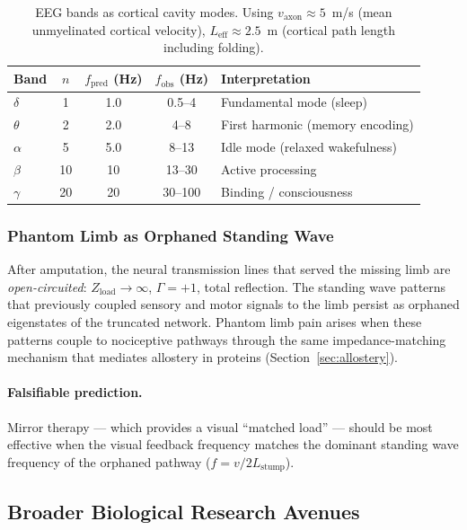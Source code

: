 \begin{table}[H]
\centering
\caption{EEG bands as cortical cavity modes.  Using
$v_\text{axon} \approx 5$~m/s (mean unmyelinated cortical
velocity), $L_\text{eff} \approx 2.5$~m (cortical path
length including folding).}
\label{tab:eeg_modes}
\small
\begin{tabular}{@{}l c c c l@{}}
\toprule
\textbf{Band} & $n$ & $f_\text{pred}$ (Hz) & $f_\text{obs}$ (Hz) & \textbf{Interpretation} \\
\midrule
$\delta$ & 1 & 1.0 & 0.5--4   & Fundamental mode (sleep) \\
$\theta$ & 2 & 2.0 & 4--8     & First harmonic (memory encoding) \\
$\alpha$ & 5 & 5.0 & 8--13    & Idle mode (relaxed wakefulness) \\
$\beta$  & 10 & 10  & 13--30   & Active processing \\
$\gamma$ & 20 & 20  & 30--100  & Binding / consciousness \\
\bottomrule
\end{tabular}
\end{table}


\subsubsection{Phantom Limb as Orphaned Standing Wave}
\label{sec:phantom_limb}

After amputation, the neural transmission lines that served
the missing limb are \emph{open-circuited}: $Z_\text{load}
\to \infty$, $\Gamma = +1$, total reflection.  The standing
wave patterns that previously coupled sensory and motor
signals to the limb persist as orphaned eigenstates of the
truncated network.  Phantom limb pain arises when these
patterns couple to nociceptive pathways through the same
impedance-matching mechanism that mediates allostery in
proteins (Section~\ref{sec:allostery}).

\paragraph{Falsifiable prediction.}
Mirror therapy --- which provides a visual ``matched load''
--- should be most effective when the visual feedback
frequency matches the dominant standing wave frequency of
the orphaned pathway ($f = v / 2L_\text{stump}$).

\subsection{Broader Biological Research Avenues}
\label{sec:broader_avenues}

